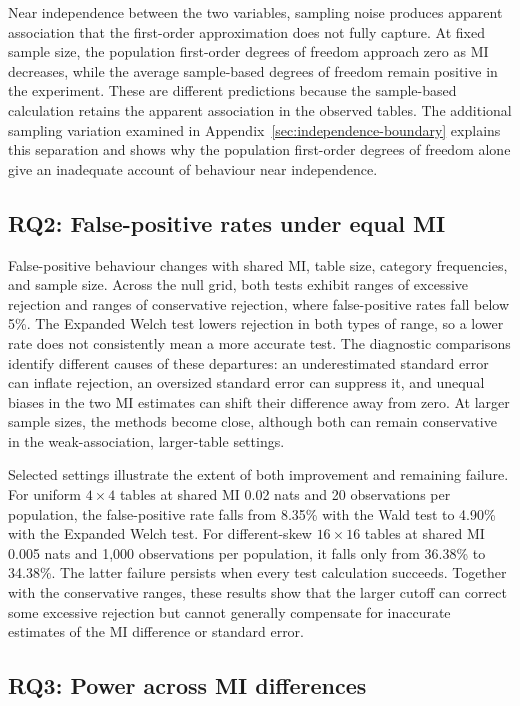 Near independence between the two variables, sampling noise produces
apparent association that the first-order approximation does not fully
capture. At fixed sample size, the population first-order degrees of
freedom approach zero as MI decreases, while the average sample-based
degrees of freedom remain positive in the experiment. These are different
predictions because the sample-based calculation retains the apparent
association in the observed tables. The additional sampling variation
examined in Appendix~\ref{sec:independence-boundary} explains this
separation and shows why the population first-order degrees of freedom
alone give an inadequate account of behaviour near independence.

\subsection{RQ2: False-positive rates under equal MI}

False-positive behaviour changes with shared MI, table size, category
frequencies, and sample size. Across the null grid, both tests exhibit
ranges of excessive rejection and ranges of conservative rejection, where
false-positive rates fall below 5\%. The Expanded Welch test lowers
rejection in both types of range, so a lower rate does not consistently
mean a more accurate test. The diagnostic comparisons identify different
causes of these departures: an underestimated standard error can inflate
rejection, an oversized standard error can suppress it, and unequal biases
in the two MI estimates can shift their difference away from zero.
At larger sample sizes, the methods become close, although both can remain
conservative in the weak-association, larger-table settings.

Selected settings illustrate the extent of both improvement and remaining
failure. For uniform \(4\times4\) tables at shared MI 0.02 nats and
20 observations per population, the false-positive rate falls from 8.35\%
with the Wald test to 4.90\% with the Expanded Welch test. For
different-skew \(16\times16\) tables at shared MI 0.005 nats and
1,000 observations per population, it falls only from 36.38\% to 34.38\%.
The latter failure persists when every test calculation succeeds. Together
with the conservative ranges, these results show that the larger cutoff
can correct some excessive rejection but cannot generally compensate for
inaccurate estimates of the MI difference or standard error.

\subsection{RQ3: Power across MI differences}

